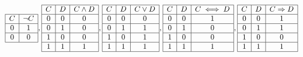 \begin{equation*}
    \begin{array}{| c | c |}
        \hline
        C & \neg C \\
        \hline
        0 & 1 \\
        \hline
        0 & 0 \\
        \hline
    \end{array},
    \begin{array}{| c | c | c |}
        \hline
        C & D & C \land D \\
        \hline
        0 & 0 & 0 \\
        \hline
        0 & 1 & 0 \\
        \hline
        1 & 0 & 0 \\
        \hline
        1 & 1 & 1 \\
        \hline
    \end{array},
    \begin{array}{| c | c | c |}
        \hline
        C & D & C \lor D \\
        \hline
        0 & 0 & 0 \\
        \hline
        0 & 1 & 1 \\
        \hline
        1 & 0 & 1 \\
        \hline
        1 & 1 & 1 \\
        \hline
    \end{array},
    \begin{array}{| c | c | c |}
        \hline
        C & D & C \iff D \\
        \hline
        0 & 0 & 1 \\
        \hline
        0 & 1 & 0 \\
        \hline
        1 & 0 & 0 \\
        \hline
        1 & 1 & 1 \\
        \hline
    \end{array},
    \begin{array}{| c | c | c |}
        \hline
        C & D & C \implies D \\
        \hline
        0 & 0 & 1 \\
        \hline
        0 & 1 & 1 \\
        \hline
        1 & 0 & 0 \\
        \hline
        1 & 1 & 1 \\
        \hline
    \end{array}
\end{equation*}


